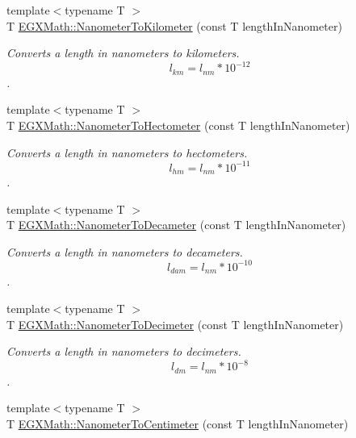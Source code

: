 \begin{DoxyCompactItemize}
{\footnotesize template$<$typename T $>$ }\\T \mbox{\hyperlink{group___e_g_x_math-_conversions-_length_conversions-_s_i-_nanometer-_s_i_gaadb5b2460069bb749412818e7aa6ee3b}{E\+G\+X\+Math\+::\+Nanometer\+To\+Kilometer}} (const T length\+In\+Nanometer)
\begin{DoxyCompactList}\small\item\em Converts a length in nanometers to kilometers. \[ l_{km}=l_{nm} * 10^{-12} \]. \end{DoxyCompactList}\item 
{\footnotesize template$<$typename T $>$ }\\T \mbox{\hyperlink{group___e_g_x_math-_conversions-_length_conversions-_s_i-_nanometer-_s_i_ga106931c80902a638a38099d2fe2ba99e}{E\+G\+X\+Math\+::\+Nanometer\+To\+Hectometer}} (const T length\+In\+Nanometer)
\begin{DoxyCompactList}\small\item\em Converts a length in nanometers to hectometers. \[ l_{hm}=l_{nm} * 10^{-11} \]. \end{DoxyCompactList}\item 
{\footnotesize template$<$typename T $>$ }\\T \mbox{\hyperlink{group___e_g_x_math-_conversions-_length_conversions-_s_i-_nanometer-_s_i_gabd4fa6935aab15cac606410d0da3b22d}{E\+G\+X\+Math\+::\+Nanometer\+To\+Decameter}} (const T length\+In\+Nanometer)
\begin{DoxyCompactList}\small\item\em Converts a length in nanometers to decameters. \[ l_{dam}=l_{nm} * 10^{-10} \]. \end{DoxyCompactList}\item 
{\footnotesize template$<$typename T $>$ }\\T \mbox{\hyperlink{group___e_g_x_math-_conversions-_length_conversions-_s_i-_nanometer-_s_i_ga3be41b7dc346f2f5745d761c9f6c743d}{E\+G\+X\+Math\+::\+Nanometer\+To\+Decimeter}} (const T length\+In\+Nanometer)
\begin{DoxyCompactList}\small\item\em Converts a length in nanometers to decimeters. \[ l_{dm}=l_{nm} * 10^{-8} \]. \end{DoxyCompactList}\item 
{\footnotesize template$<$typename T $>$ }\\T \mbox{\hyperlink{group___e_g_x_math-_conversions-_length_conversions-_s_i-_nanometer-_s_i_ga8c37dcaf6ef783c2cf44af0f65633841}{E\+G\+X\+Math\+::\+Nanometer\+To\+Centimeter}} (const T length\+In\+Nanometer)

\end{DoxyCompactItemize}

